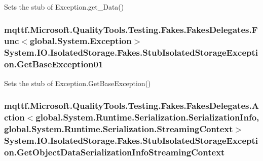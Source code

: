 Sets the stub of Exception.\-get\-\_\-\-Data()

\hypertarget{class_system_1_1_i_o_1_1_isolated_storage_1_1_fakes_1_1_stub_isolated_storage_exception_ab8131c3962b14023be29608f0466bb73}{
\subsubsection[{Get\-Base\-Exception01}]{\setlength{\rightskip}{0pt plus 5cm}mqttf.\-Microsoft.\-Quality\-Tools.\-Testing.\-Fakes.\-Fakes\-Delegates.\-Func$<$global.\-System.\-Exception$>$ System.\-I\-O.\-Isolated\-Storage.\-Fakes.\-Stub\-Isolated\-Storage\-Exception.\-Get\-Base\-Exception01}}\label{class_system_1_1_i_o_1_1_isolated_storage_1_1_fakes_1_1_stub_isolated_storage_exception_ab8131c3962b14023be29608f0466bb73}


Sets the stub of Exception.\-Get\-Base\-Exception()

\hypertarget{class_system_1_1_i_o_1_1_isolated_storage_1_1_fakes_1_1_stub_isolated_storage_exception_a5f3888cada88511f759dbbfaf4d94735}{
\subsubsection[{Get\-Object\-Data\-Serialization\-Info\-Streaming\-Context}]{\setlength{\rightskip}{0pt plus 5cm}mqttf.\-Microsoft.\-Quality\-Tools.\-Testing.\-Fakes.\-Fakes\-Delegates.\-Action$<$global.\-System.\-Runtime.\-Serialization.\-Serialization\-Info, global.\-System.\-Runtime.\-Serialization.\-Streaming\-Context$>$ System.\-I\-O.\-Isolated\-Storage.\-Fakes.\-Stub\-Isolated\-Storage\-Exception.\-Get\-Object\-Data\-Serialization\-Info\-Streaming\-Context}}\label{class_system_1_1_i_o_1_1_isolated_storage_1_1_fakes_1_1_stub_isolated_storage_exception_a5f3888cada88511f759dbbfaf4d94735}


